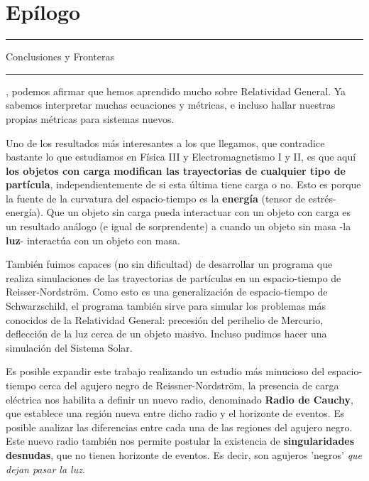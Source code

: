 \chapter*{\textcolor{myred}{Epílogo}}

\textcolor{black}{\hrule}
\vspace{0.5cm}
{\huge{Conclusiones y Fronteras}}
\vspace{0.5cm}
\textcolor{black}{\hrule}

, podemos afirmar que hemos aprendido mucho sobre Relatividad General. Ya sabemos interpretar muchas ecuaciones y métricas, e incluso hallar nuestras propias métricas para sistemas nuevos.

\vspace{0.5cm}

Uno de los resultados más interesantes a los que llegamos, que contradice bastante lo que estudiamos en Física III y Electromagnetismo I y II, es que aquí \textbf{los objetos con carga modifican las trayectorias de cualquier tipo de partícula}, independientemente de si esta última tiene carga o no. Esto es porque la fuente de la curvatura del espacio-tiempo es la \textbf{energía} (tensor de estrés-energía). Que un objeto sin carga pueda interactuar con un objeto con carga es un resultado análogo (e igual de sorprendente) a cuando un objeto sin masa -la \textbf{luz}- interactúa con un objeto con masa.

\vspace{0.5cm}

También fuimos capaces (no sin dificultad) de desarrollar un programa que realiza simulaciones de las trayectorias de partículas en un espacio-tiempo de Reisser-Nordström. Como esto es una generalización de espacio-tiempo de Schwarzschild, el programa también sirve para simular los problemas más conocidos de la Relatividad General: precesión del perihelio de Mercurio, deflección de la luz cerca de un objeto masivo. Incluso pudimos hacer una simulación del Sistema Solar.

\vspace{0.5cm}

Es posible expandir este trabajo realizando un estudio más minucioso del espacio-tiempo cerca del agujero negro de Reissner-Nordström, la presencia de carga eléctrica nos habilita a definir un nuevo radio, denominado \textbf{Radio de Cauchy}, que establece una región nueva entre dicho radio y el horizonte de eventos. Es posible analizar las diferencias entre cada una de las regiones del agujero negro. Este nuevo radio también nos permite postular la existencia de \textbf{singularidades desnudas}, que no tienen horizonte de eventos. Es decir, son agujeros 'negros' \textit{que dejan pasar la luz}.

